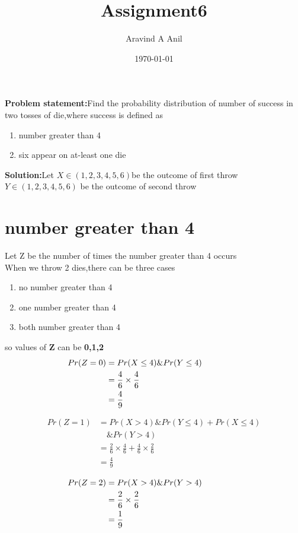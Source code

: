 \documentclass[11pt,a4paper,twocolumn]{article}
\title{Assignment6}
\author{Aravind A Anil}
\date{\today}
\begin{document}
\maketitle
\begin{flushleft}
\textbf{Problem statement:}Find the probability distribution of number of success in two tosses of die,where success is defined as
\begin{enumerate}[i]
    \item number greater than 4
    \item six appear on at-least one die
\end{enumerate}
\textbf{Solution:}Let $X\in(1,2,3,4,5,6)$be the outcome of first throw\\
$Y\in(1,2,3,4,5,6)$ be the outcome of second throw
\section{number greater than 4}
Let Z be the number of times the number greater than 4 occurs\\
When we throw 2 dies,there can be three cases
\begin{enumerate}
    \item no number greater than 4
    \item one number greater than 4
    \item both number greater than 4
\end{enumerate}
so values of \textbf{Z} can be \textbf{0,1,2}\\
\begin{align*}
\hspace{-3cm}
Pr(Z=0)&=Pr(X\leq4)\&Pr(Y\leq4)\\
&=\frac{4}{6}\times\frac{4}{6}\\
&=\frac{4}{9}
\end{align*}

\begin{align*}
    Pr(Z=1)&=Pr(X>4)\&Pr(Y\leq4)+Pr(X\leq4)\\
    &\quad\&Pr(Y>4)\\
    &=\frac{2}{6}\times\frac{4}{6}+\frac{4}{6}\times\frac{2}{6}\\
    &=\frac{4}{9}
\end{align*}
\end{flushleft}
\begin{align*}
\hspace{-5cm}
    Pr(Z=2)&=Pr(X>4)\&Pr(Y>4)\\
    &=\frac{2}{6}\times\frac{2}{6}\\
    &=\frac{1}{9}
\end{align*}
\end{document}
